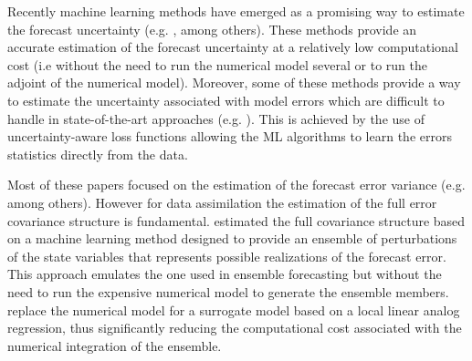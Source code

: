 \documentclass[num-refs]{wiley-article}
\begin{document}




Recently machine learning methods have emerged as a promising way to estimate the forecast uncertainty (e.g. \citep{camporeale2,wang,gronquist2019,grooms2021,lguensat2018,saccoetal2022,irrgangetal2020}, among others). These methods provide an accurate estimation of the forecast uncertainty at a relatively low computational cost (i.e without the need to run the numerical model several or to run the adjoint of the numerical model). Moreover, some of these methods provide a way to estimate the uncertainty associated with model errors which are difficult to handle in state-of-the-art approaches (e.g. \cite{camporeale1,wang,saccoetal2021}). This is achieved by the use of uncertainty-aware loss functions allowing the ML algorithms to learn the errors statistics directly from the data. 

Most of these papers focused on the estimation of the forecast error variance (e.g. \cite{wang,camporeale1,gronquist2019,irrgangetal2020,saccoetal2022} among others). However for data assimilation the estimation of the full error covariance structure is fundamental. \cite{grooms2021} estimated the full covariance structure based on a machine learning method designed to provide an ensemble of perturbations of the state variables that represents possible realizations of the forecast error. This approach emulates the one used in ensemble forecasting but without the need to run the expensive numerical model to generate the ensemble members. \cite{lguensat2018} replace the numerical model for a surrogate model based on a local linear analog regression, thus significantly reducing the computational cost associated with the numerical integration of the ensemble. 
\end{document}
